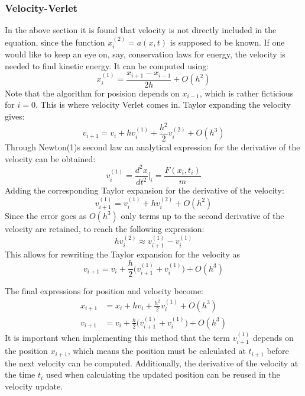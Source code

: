\subsubsection{Velocity-Verlet}
In the above section it is found that velocity is not directly included in the equation, since
the function $x_i^{{(2)}} = a(x,t)$ is supposed to be known. If one would like to keep an eye on, say,
conservation laws for energy, the velocity is needed to find kinetic energy. It can be computed
using:
\begin{equation*}
x_i^{(1)} = \frac{x_{i+1} - x_{i-1}}{2h} + O(h^2)
\end{equation*}
Note that the algorithm for posision depends on $x_{i-1}$, which is rather ficticious for $i=0$.
This is where velocity Verlet comes in. 
\newline
Taylor expanding the velocity gives:
\begin{equation*}
v_{i+1} = v_i + hv_i^{(1)} + \frac{h^2}{2}v_i^{{(2)}} + O(h^3)
\end{equation*}
Through Newton{(1)}s second law an analytical expression for the derivative of the velocity can be
obtained:
\begin{equation*}
v_i^{(1)} = \frac{d^2x}{dt^2}|_i =\frac{F(x_i,t_i)}{m}
\end{equation*}
Adding the corresponding Taylor expansion for the derivative of the velocity:
\begin{equation*}
v_{i+1}^{(1)} = v_i^{(1)} + hv_i^{{(2)}} + O(h^2)
\end{equation*}
Since the error goes as $O(h^3)$ only terms up to the second derivative of the velocity are retained,
to reach the following expression:
\begin{equation*}
hv_i^{{(2)}} \approx v_{i+1}^{(1)} - v_i^{(1)}
\end{equation*}
This allows for rewriting the Taylor expansion for the velocity as
\begin{equation*}
v_{i+1} = v_i + \frac{h}{2}\big(v_{i+1}^{(1)} + v_i^{(1)}\big) + O(h^3)
\end{equation*}

The final expressions for position and velocity become:
\begin{align*}
x_{i+1} &= x_i + hv_i + \frac{h^2}{2}v_i^{(1)} + O(h^3) \\
v_{i+1} &= v_i + \frac{h}{2}\big(v_{i+1}^{(1)} + v_i^{(1)}\big) + O(h^3)
\end{align*}
It is important when implementing this method that the term $v_{i+1}^{(1)}$ depends on the position
$x_{i+1}$, which means the position must be calculated at $t_{i+1}$ before the next velocity can
be computed. Additionally, the derivative of the velocity at the time $t_i$ used when calculating
the updated position can be reused in the velocity update.




